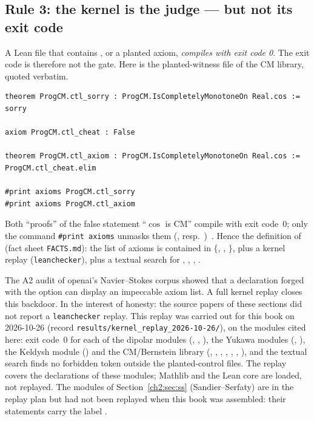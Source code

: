 \subsection{Rule 3: the kernel is the judge --- but not its exit code}\label{ch2:ssec:noyau}
A Lean file that contains , or a planted axiom, \emph{compiles with exit code 0}. The exit code is therefore
not the gate. Here is the planted-witness file of the CM library, quoted verbatim.
\begin{leanbox}
\begin{lstlisting}[style=chdeux]
theorem ProgCM.ctl_sorry : ProgCM.IsCompletelyMonotoneOn Real.cos := sorry

axiom ProgCM.ctl_cheat : False

theorem ProgCM.ctl_axiom : ProgCM.IsCompletelyMonotoneOn Real.cos := ProgCM.ctl_cheat.elim

#print axioms ProgCM.ctl_sorry
#print axioms ProgCM.ctl_axiom
\end{lstlisting}
\end{leanbox}
\noindent Both ``proofs'' of the false statement ``$\cos$ is CM'' compile with exit code~0; only the command
\texttt{\#print axioms} unmasks them (, resp.\ )~\cite{p3}. Hence the definition of
\tierA{} (fact sheet \texttt{FACTS.md}): the list of axioms is contained in $\{$, ,
$\}$, plus a kernel replay (\texttt{leanchecker}), plus a textual search for
, , , .

\begin{remark}\label{ch2:rem:skip}
The A2 audit of openai's Navier--Stokes corpus showed that a declaration forged with the option
 can display an impeccable axiom list. A full kernel replay closes this
backdoor. In the interest of honesty: the source papers of these sections did not report a \texttt{leanchecker} replay. This replay was
carried out for this book on 2026-10-26 (record \texttt{results/kernel\_replay\_2026-10-26/}), on the modules
cited here: exit code~0 for each of the dipolar modules (, ,
), the Yukawa modules (, ), the Keldysh module () and the
CM/Bernstein library (, , , , ,
, ), and the textual search finds no forbidden token outside the planted-control
files. The replay covers the declarations of these modules; Mathlib and the Lean core are loaded, not replayed.
The modules of Section~\ref{ch2:sec:ss} (Sandier--Serfaty) are in the replay plan but had not been
replayed when this book was assembled: their statements carry the label \tierAs{}.
\end{remark}


